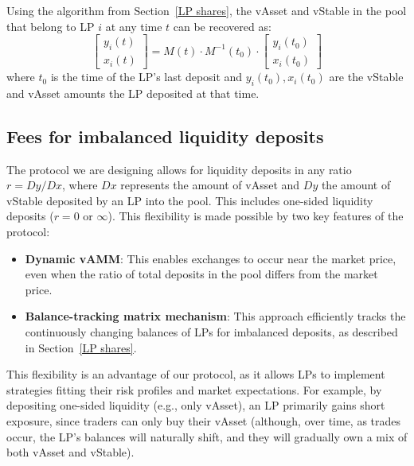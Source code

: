 \documentclass{article}
\begin{document}
\medskip
Using the algorithm from Section~\ref{LP shares}, the vAsset and vStable in the pool that
belong to LP $i$ at any time $t$ can be recovered as:
\begin{equation}\label{lp balance recovery}
\begin{bmatrix} y_i(t) \\ x_i(t) \end{bmatrix}
= M(t) \cdot M^{-1}(t_0) \cdot \begin{bmatrix} y_i(t_0) \\ x_i(t_0) \end{bmatrix}
\end{equation}
where $t_0$ is the time of the LP's last deposit and $y_i(t_0), x_i(t_0)$ are the vStable
and vAsset amounts the LP deposited at that time.



\subsection{Fees for imbalanced liquidity deposits}

The protocol we are designing allows for liquidity deposits in any ratio $r = Dy/Dx$,
where $Dx$ represents the amount of vAsset and $Dy$ the amount of vStable deposited by an
LP into the pool. This includes one-sided liquidity deposits ($r = 0$ or $\infty$). This
flexibility is made possible by two key features of the protocol:

\begin{itemize}

\item \textbf{Dynamic vAMM}: This enables exchanges to occur near the market price, even
      when the ratio of total deposits in the pool differs from the market price.

\item \textbf{Balance-tracking matrix mechanism}: This approach efficiently tracks the
      continuously changing balances of LPs for imbalanced deposits, as described in
      Section~\ref{LP shares}.

\end{itemize}

This flexibility is an advantage of our protocol, as it allows LPs to implement strategies
fitting their risk profiles and market expectations. For example, by depositing one-sided
liquidity (e.g., only vAsset), an LP primarily gains short exposure, since traders can only
buy their vAsset (although, over time, as trades occur, the LP's balances will naturally
shift, and they will gradually own a mix of both vAsset and vStable).
\end{document}
